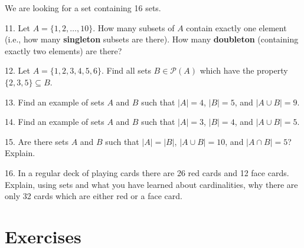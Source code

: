 \documentclass[10pt,]{book}
\newcommand{\terminology}[1]{\textbf{#1}}
\theoremstyle{plain}
\theoremstyle{definition}
\numberwithin{equation}{chapter}
\def\pow{\mathcal P}
\begin{document}
\begin{exerciselist}
          We are looking for a set containing 16 sets.
\item[11.]\hypertarget{exercise-21}{}
          Let \(A = \{1,2,\ldots, 10\}\). How many subsets of \(A\) contain exactly one element (i.e., how many \terminology{singleton} subsets are there). How many \terminology{doubleton} (containing exactly two elements) are there?
\par\smallskip
\item[12.]\hypertarget{exercise-22}{}
          Let \(A = \{1,2,3,4,5,6\}\). Find all sets \(B \in \pow(A)\) which have the property \(\{2,3,5\} \subseteq B\).
\par\smallskip
\item[13.]\hypertarget{exercise-23}{}
          Find an example of sets \(A\) and \(B\) such that \(|A| = 4\), \(|B| = 5\), and \(|A \cup B| = 9\).
\par\smallskip
\item[14.]\hypertarget{exercise-24}{}
          Find an example of sets \(A\) and \(B\) such that \(|A| = 3\), \(|B| = 4\), and \(|A \cup B| = 5\).
\par\smallskip
\item[15.]\hypertarget{exercise-25}{}
          Are there sets \(A\) and \(B\) such that \(|A| = |B|\), \(|A\cup B| = 10\), and \(|A\cap B| = 5\)? Explain.
\par\smallskip
\item[16.]\hypertarget{exercise-26}{}
          In a regular deck of playing cards there are 26 red cards and 12 face cards. Explain, using sets and what you have learned about cardinalities, why there are only 32 cards which are either red or a face card.
\par\smallskip
\end{exerciselist}
\typeout{************************************************}
\typeout{************************************************}
\section[Exercises]{Exercises}\label{section-4}
\typeout{************************************************}
\typeout{************************************************}
\end{document}
